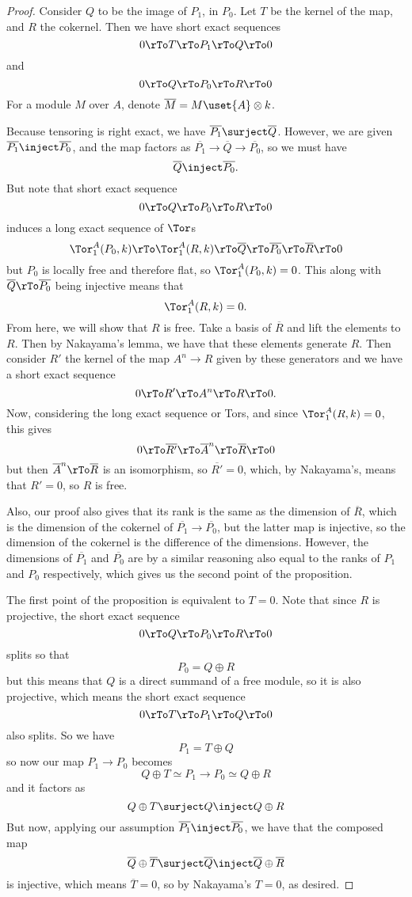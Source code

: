 \documentclass[12 pt]{article}
\theoremstyle{definition}
\begin{document}
\begin{proof} Consider $Q$ to be the image of $P_1$, in $P_0$. Let $T$ be the kernel of the map, and $R$ the cokernel. Then we have short exact sequences
\[0 \rTo T \rTo P_1 \rTo Q \rTo 0\]
and
\[0 \rTo Q \rTo P_0 \rTo R \rTo 0\]
For a module $M$ over $A$, denote $\overline{M}=M \uset{A}\otimes k$.

Because tensoring is right exact, we have $\overline{P_1} \surject \overline{Q}$. However, we are given $\overline{P_1} \inject \overline{P_0}$, and the map factors as $\overline{P_1} \to \overline{Q} \to \overline{P_0}$, so we must have
\[\overline{Q} \inject \overline{P_0}.\]
But note that short exact sequence
\[0 \rTo Q \rTo P_0 \rTo R \rTo 0\]
induces a long exact sequence of $\Tor$s
\[\Tor_1^A(P_0, k) \rTo \Tor_1^A(R, k) \rTo \overline{Q} \rTo \overline{P_0} \rTo \overline{R} \rTo 0\]
but $P_0$ is locally free and therefore flat, so $\Tor_1^A(P_0,k)=0$. This along with $\overline{Q} \rTo \overline{P_0}$ being injective means that
\[\Tor_1^A(R, k)=0.\]
From here, we will show that $R$ is free. Take a basis of $\overline{R}$ and lift the elements to $R$. Then by Nakayama's lemma, we have that these elements generate $R$. Then consider $R'$ the kernel of the map $A^n \to R$ given by these generators and we have a short exact sequence
\[0 \rTo R' \rTo A^n \rTo R \rTo 0.\]
Now, considering the long exact sequence or Tors, and since $\Tor_1^A(R,k)=0$, this gives
\[0 \rTo \overline{R'} \rTo \overline{A}^n \rTo \overline{R} \rTo 0\]
but then $\overline{A}^n \rTo \overline{R}$ is an isomorphism, so $\overline{R'}=0$, which, by Nakayama's, means that $R'=0$, so $R$ is free.

Also, our proof also gives that its rank is the same as the dimension of $\overline{R}$, which is the dimension of the cokernel of $\overline{P_1} \to \overline{P_0}$, but the latter map is injective, so the dimension of the cokernel is the difference of the dimensions. However, the dimensions of $\overline{P_1}$ and $\overline{P_0}$ are by a similar reasoning also equal to the ranks of $P_1$ and $P_0$ respectively, which gives us the second point of the proposition.

The first point of the proposition is equivalent to $T=0$. Note that since $R$ is projective, the short exact sequence
\[0 \rTo Q \rTo P_0 \rTo R \rTo 0\]
splits so that
\[P_0=Q \oplus R\]
but this means that $Q$ is a direct summand of a free module, so it is also projective, which means the short exact sequence
\[0 \rTo T \rTo P_1 \rTo Q \rTo 0\]
also splits. So we have
\[P_1=T \oplus Q\]
so now our map $P_1 \to P_0$ becomes
\[Q \oplus T \simeq P_1 \to P_0 \simeq Q \oplus R\]
and it factors as
\[Q \oplus T \surject Q \inject Q \oplus R\]
But now, applying our assumption $\overline{P_1} \inject \overline{P_0}$, we have that the composed map
\[\overline{Q} \oplus \overline{T} \surject \overline{Q} \inject \overline{Q} \oplus \overline{R}\]
is injective, which means $\overline{T}=0$, so by Nakayama's $T=0$, as desired.
\end{proof}
\end{document}
